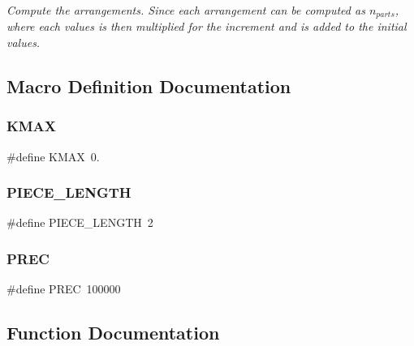 \begin{DoxyCompactItemize}
\begin{DoxyCompactList}\small\item\em Compute the arrangements. Since each arrangement can be computed as $n_{parts}$, where each values is then multiplied for the increment and is added to the initial values. \end{DoxyCompactList}\end{DoxyCompactItemize}


\subsection{Macro Definition Documentation}
\mbox{\label{dubins_8hh_a940b85a83458e94519f2685b33ddd276}} 
\subsubsection{\texorpdfstring{KMAX}{KMAX}}
{\footnotesize\ttfamily \#define K\+M\+AX~0.}

\mbox{\label{dubins_8hh_a5b2500ca93a5100f73dc442d3cfea7d4}} 
\subsubsection{\texorpdfstring{PIECE\_LENGTH}{PIECE\_LENGTH}}
{\footnotesize\ttfamily \#define P\+I\+E\+C\+E\+\_\+\+L\+E\+N\+G\+TH~2}

\mbox{\label{dubins_8hh_a2bda1a81ce3474772a8a1f165e54516e}} 
\subsubsection{\texorpdfstring{PREC}{PREC}}
{\footnotesize\ttfamily \#define P\+R\+EC~100000}



\subsection{Function Documentation}
\mbox{\label{dubins_8hh_adef8b363044d7fed558e5b47d8d6a3a0}} 
